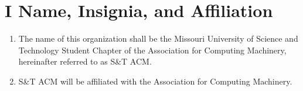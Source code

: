 \section{I \textendash{} Name, Insignia, and Affiliation}
\begin{enumerate}[label=\arabic*.]
  \item The name of this organization shall be the Missouri University of
  Science and Technology Student Chapter of the Association for Computing
  Machinery, hereinafter referred to as S\&T ACM.
  \item S\&T ACM will be affiliated with the Association for Computing Machinery.
\end{enumerate}
